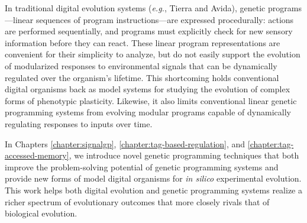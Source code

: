 In traditional digital evolution systems (\textit{e.g.}, Tierra and Avida), genetic programs---linear sequences of program instructions---are expressed procedurally: actions are performed sequentially, and programs must explicitly check for new sensory information before they can react.
These linear program representations are convenient for their simplicity to analyze, but do not easily support the evolution of modularized responses to environmental signals that can be dynamically regulated over the organism's lifetime.
This shortcoming holds conventional digital organisms back as model systems for studying the evolution of complex forms of phenotypic plasticity.
Likewise, it also limits conventional linear genetic programming systems from evolving modular programs capable of dynamically regulating responses to inputs over time. 


In Chapters \ref{chapter:signalgp}, \ref{chapter:tag-based-regulation}, and \ref{chapter:tag-accessed-memory}, we introduce novel genetic programming techniques that both improve the problem-solving potential of genetic programming systems and provide new forms of model digital organisms for \textit{in silico} experimental evolution.
This work helps both digital evolution and genetic programming systems realize a richer spectrum of evolutionary outcomes that more closely rivals that of biological evolution.

